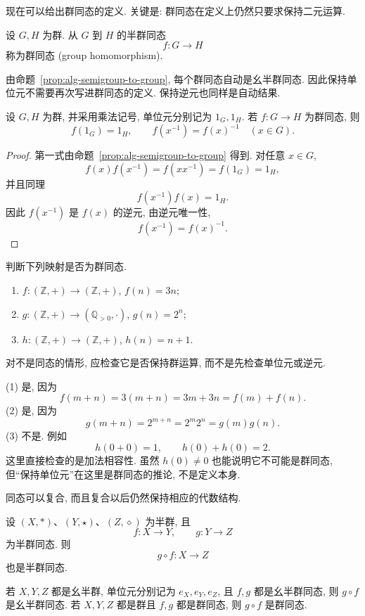 \documentclass[usesamecnt, thmcnt=section, lang=cn, newtx, 10pt, scheme=chinese]{elegantbook}
\begin{document}
现在可以给出群同态的定义. 关键是: 群同态在定义上仍然只要求保持二元运算.

\begin{definition}[群同态]\label{def:alg-group-hom}
设 $G,H$ 为群. 从 $G$ 到 $H$ 的半群同态
\[
 f:G\longrightarrow H
\]
称为{\color{blue}群同态 (group homomorphism)}.
\end{definition}

由命题~\ref{prop:alg-semigroup-to-group}, 每个群同态自动是幺半群同态. 因此保持单位元不需要再次写进群同态的定义. 保持逆元也同样是自动结果.

\begin{proposition}\label{prop:alg-hom-basic}
设 $G,H$ 为群, 并采用乘法记号, 单位元分别记为 $1_G,1_H$. 若 $f:G\to H$ 为群同态, 则
\[
 f(1_G)=1_H,
 \qquad
 f(x^{-1})=f(x)^{-1}\quad(x\in G).
\]
\end{proposition}

\begin{proof}
第一式由命题~\ref{prop:alg-semigroup-to-group} 得到. 对任意 $x\in G$,
\[
 f(x)f(x^{-1})
 =f(xx^{-1})
 =f(1_G)
 =1_H,
\]
并且同理
\[
 f(x^{-1})f(x)=1_H.
\]
因此 $f(x^{-1})$ 是 $f(x)$ 的逆元, 由逆元唯一性,
\[
 f(x^{-1})=f(x)^{-1}.
\]
\end{proof}

\begin{concept}\label{con:alg-hom-01}
判断下列映射是否为群同态.
\begin{enumerate}[label=\rm(\arabic*)]
  \item $f:(\mathbb Z,+)\to(\mathbb Z,+)$, $f(n)=3n$;
  \item $g:(\mathbb Z,+)\to(\mathbb Q_{>0},\cdot)$, $g(n)=2^n$;
  \item $h:(\mathbb Z,+)\to(\mathbb Z,+)$, $h(n)=n+1$.
\end{enumerate}
对不是同态的情形, 应检查它是否保持群运算, 而不是先检查单位元或逆元.
\end{concept}

\begin{solution}
(1) 是, 因为
\[
 f(m+n)=3(m+n)=3m+3n=f(m)+f(n).
\]
(2) 是, 因为
\[
 g(m+n)=2^{m+n}=2^m2^n=g(m)g(n).
\]
(3) 不是. 例如
\[
 h(0+0)=1,
 \qquad
 h(0)+h(0)=2.
\]
这里直接检查的是加法相容性. 虽然 $h(0)\neq0$ 也能说明它不可能是群同态, 但``保持单位元''在这里是群同态的推论, 不是定义本身.
\end{solution}

同态可以复合, 而且复合以后仍然保持相应的代数结构.

\begin{proposition}\label{prop:alg-hom-composition}
设 $(X,*)$、$(Y,\star)$、$(Z,\diamond)$ 为半群, 且
\[
 f:X\to Y,\qquad g:Y\to Z
\]
为半群同态. 则
\[
 g\circ f:X\to Z
\]
也是半群同态.

若 $X,Y,Z$ 都是幺半群, 单位元分别记为 $e_X,e_Y,e_Z$, 且 $f,g$ 都是幺半群同态, 则 $g\circ f$ 是幺半群同态. 若 $X,Y,Z$ 都是群且 $f,g$ 都是群同态, 则 $g\circ f$ 是群同态.
\end{proposition}
\end{document}
